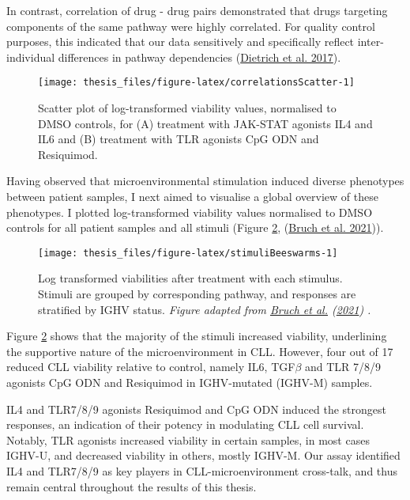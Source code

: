 \documentclass[11pt, a4paper, twosided]{book}
\begin{document}
In contrast, correlation of drug - drug pairs demonstrated that drugs targeting components of the same pathway were highly correlated. For quality control purposes, this indicated that our data sensitively and specifically reflect inter-individual differences in pathway dependencies (\protect\hyperlink{ref-JCIpaper}{Dietrich et al. 2017}).


\begin{figure}

{\centering \texttt{[image: thesis\_files/figure-latex/correlationsScatter-1]} 

}

\caption{Scatter plot of log-transformed viability values, normalised to DMSO controls, for (A) treatment with JAK-STAT agonists IL4 and IL6 and (B) treatment with TLR agonists CpG ODN and Resiquimod.}\label{fig:correlationsScatter}
\end{figure}
Having observed that microenvironmental stimulation induced diverse phenotypes between patient samples, I next aimed to visualise a global overview of these phenotypes. I plotted log-transformed viability values normalised to DMSO controls for all patient samples and all stimuli (Figure \ref{fig:stimuliBeeswarms}, (\protect\hyperlink{ref-Giles2021}{Bruch et al. 2021})).


\begin{figure}

{\centering \texttt{[image: thesis\_files/figure-latex/stimuliBeeswarms-1]} 

}

\caption{Log transformed viabilities after treatment with each stimulus. Stimuli are grouped by corresponding pathway, and responses are stratified by IGHV status. \emph{Figure adapted from \protect\hyperlink{ref-Giles2021}{Bruch et al.} (\protect\hyperlink{ref-Giles2021}{2021}) .}}\label{fig:stimuliBeeswarms}
\end{figure}
Figure \ref{fig:stimuliBeeswarms} shows that the majority of the stimuli increased viability, underlining the supportive nature of the microenvironment in CLL. However, four out of 17 reduced CLL viability relative to control, namely IL6, TGF\(\beta\) and TLR 7/8/9 agonists CpG ODN and Resiquimod in IGHV-mutated (IGHV-M) samples.

IL4 and TLR7/8/9 agonists Resiquimod and CpG ODN induced the strongest responses, an indication of their potency in modulating CLL cell survival. Notably, TLR agonists increased viability in certain samples, in most cases IGHV-U, and decreased viability in others, mostly IGHV-M. Our assay identified IL4 and TLR7/8/9 as key players in CLL-microenvironment cross-talk, and thus remain central throughout the results of this thesis.
\end{document}
